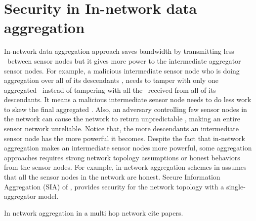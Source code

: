 \section{Security in In-network data aggregation}
	In-network data aggregation approach saves bandwidth by transmitting less \payloads\  between sensor nodes but it gives more power to the intermediate aggregator sensor nodes. 
	For example, a malicious intermediate sensor node who is doing aggregation over all of its descendants \payloads, needs to tamper with only one aggregated \payload\ instead of tampering with all the \payloads\ received from all of its descendants. 
	It means a malicious intermediate sensor node needs to do less work to skew the final aggregated \payload.
	Also, an adversary controlling few sensor nodes in the network can cause the network to return unpredictable \payloads, making an entire sensor network unreliable.
	Notice that, the more descendants an intermediate sensor node has the more powerful it becomes.
	Despite the fact that in-network aggregation makes an intermediate sensor nodes more powerful, some aggregation approaches requires strong network topology assumptions or honest behaviors from the sensor nodes.
	For example, in-network aggregation schemes in \cite{yao2002cougar, madden2003design} assumes that all the sensor nodes in the network are honest. Secure Information Aggregation (SIA) of \cite{przydatek2003sia}, provides security for the network topology with a single-aggregator model.  

In network aggregation in a  multi hop network cite papers.

